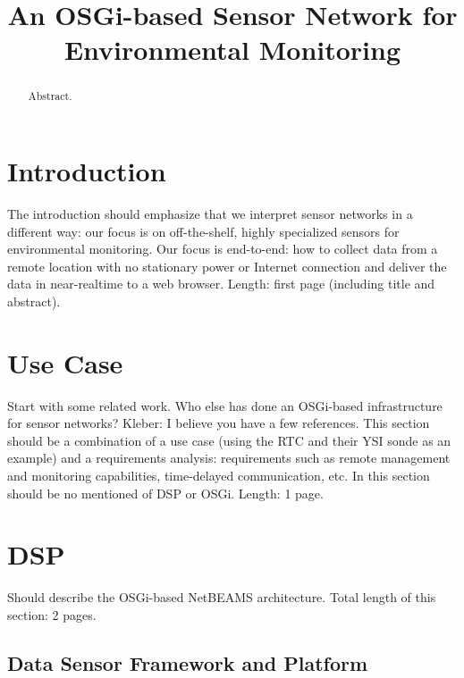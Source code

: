 \documentclass[conference]{IEEEtran}
\begin{document}
\title{An OSGi-based Sensor Network for \\ Environmental Monitoring}

\author{
}


\maketitle
\begin{abstract}
  Abstract.
\end{abstract}


\section{Introduction}

The introduction should emphasize that we interpret sensor networks in
a different way: our focus is on off-the-shelf, highly specialized
sensors for environmental monitoring. Our focus is end-to-end: how to
collect data from a remote location with no stationary power or
Internet connection and deliver the data in near-realtime to a web
browser. Length: first page (including title and abstract).

\section{Use Case}

Start with some related work. Who else has done an OSGi-based
infrastructure for sensor networks? Kleber: I believe you have a few
references. This section should be a combination of a use case (using
the RTC and their YSI sonde as an example) and a requirements
analysis: requirements such as remote management and monitoring
capabilities, time-delayed communication, etc. In this section should
be no mentioned of DSP or OSGi. Length: 1 page.

\section{DSP}

Should describe the OSGi-based NetBEAMS architecture. Total length of
this section: 2 pages.

\subsection{Data Sensor Framework and Platform}
\end{document}
